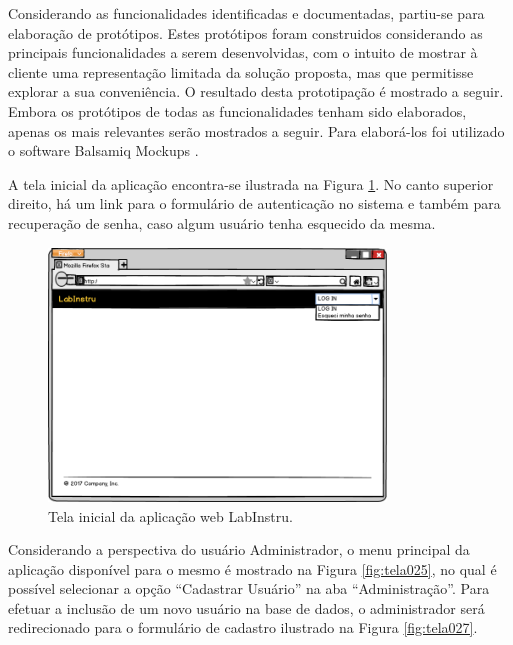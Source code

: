 Considerando as funcionalidades identificadas e documentadas, partiu-se para elaboração de protótipos. Estes protótipos foram construidos considerando as principais funcionalidades a serem desenvolvidas, com o intuito de mostrar à cliente uma representação limitada da solução proposta, mas que permitisse explorar a sua conveniência. O resultado desta prototipação é mostrado a seguir. Embora os protótipos de todas as funcionalidades tenham sido elaborados, apenas os mais relevantes serão mostrados a seguir. Para elaborá-los foi utilizado o software Balsamiq Mockups \cite{Prototipacao:Mockups}.

A tela inicial da aplicação encontra-se ilustrada na Figura  \ref{fig:tela002}. No canto superior direito, há um link para o formulário de autenticação no sistema e também para recuperação de senha, caso algum usuário tenha esquecido da mesma.

\begin{figure}[H]
	\centering
	\includegraphics[width=0.8\textwidth]{./img/telas/tela002.png}
	\caption{Tela inicial da aplicação web LabInstru.} \label{fig:tela002}
\end{figure}

Considerando a perspectiva do usuário Administrador, o menu principal da aplicação disponível para o mesmo é mostrado na Figura \ref{fig:tela025}, no qual é possível selecionar a opção ``Cadastrar Usuário'' na aba ``Administração''.  Para efetuar a inclusão de um novo usuário na base de dados, o administrador será redirecionado para o formulário de cadastro ilustrado na Figura \ref{fig:tela027}.


